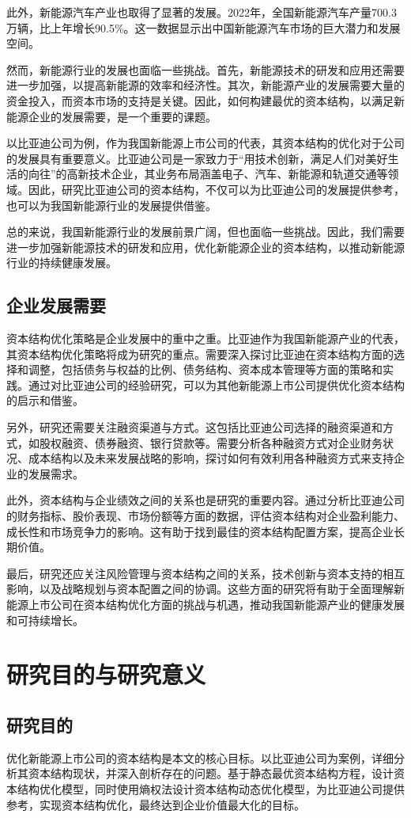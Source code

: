此外，新能源汽车产业也取得了显著的发展。2022年，全国新能源汽车产量700.3万辆，比上年增长90.5\%。这一数据显示出中国新能源汽车市场的巨大潜力和发展空间。

然而，新能源行业的发展也面临一些挑战。首先，新能源技术的研发和应用还需要进一步加强，以提高新能源的效率和经济性。其次，新能源产业的发展需要大量的资金投入，而资本市场的支持是关键。因此，如何构建最优的资本结构，以满足新能源企业的发展需要，是一个重要的课题。

以比亚迪公司为例，作为我国新能源上市公司的代表，其资本结构的优化对于公司的发展具有重要意义。比亚迪公司是一家致力于“用技术创新，满足人们对美好生活的向往”的高新技术企业，其业务布局涵盖电子、汽车、新能源和轨道交通等领域。因此，研究比亚迪公司的资本结构，不仅可以为比亚迪公司的发展提供参考，也可以为我国新能源行业的发展提供借鉴。

总的来说，我国新能源行业的发展前景广阔，但也面临一些挑战。因此，我们需要进一步加强新能源技术的研发和应用，优化新能源企业的资本结构，以推动新能源行业的持续健康发展。

\subsection{企业发展需要}
资本结构优化策略是企业发展中的重中之重。比亚迪作为我国新能源产业的代表，其资本结构优化策略将成为研究的重点。需要深入探讨比亚迪在资本结构方面的选择和调整，包括债务与权益的比例、债务结构、资本成本管理等方面的策略和实践。通过对比亚迪公司的经验研究，可以为其他新能源上市公司提供优化资本结构的启示和借鉴。

另外，研究还需要关注融资渠道与方式。这包括比亚迪公司选择的融资渠道和方式，如股权融资、债券融资、银行贷款等。需要分析各种融资方式对企业财务状况、成本结构以及未来发展战略的影响，探讨如何有效利用各种融资方式来支持企业的发展需求。

此外，资本结构与企业绩效之间的关系也是研究的重要内容。通过分析比亚迪公司的财务指标、股价表现、市场份额等方面的数据，评估资本结构对企业盈利能力、成长性和市场竞争力的影响。这有助于找到最佳的资本结构配置方案，提高企业长期价值。

最后，研究还应关注风险管理与资本结构之间的关系，技术创新与资本支持的相互影响，以及战略规划与资本配置之间的协调。这些方面的研究将有助于全面理解新能源上市公司在资本结构优化方面的挑战与机遇，推动我国新能源产业的健康发展和可持续增长。
\section{研究目的与研究意义}
\subsection{研究目的}
优化新能源上市公司的资本结构是本文的核心目标。以比亚迪公司为案例，详细分析其资本结构现状，并深入剖析存在的问题。基于静态最优资本结构方程，设计资本结构优化模型，同时使用熵权法设计资本结构动态优化模型，为比亚迪公司提供参考，实现资本结构优化，最终达到企业价值最大化的目标。

